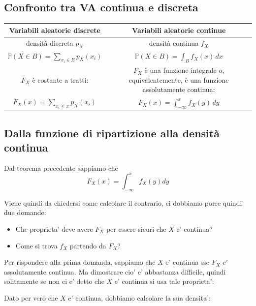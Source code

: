 \subsection{Confronto tra VA continua e discreta}
\begin{tabular}{|c|c|}
  \hline
  \textbf{Variabili aleatorie discrete} & \textbf{Variabili aleatorie continue} \\
  \hline
  densità discreta $p_X$ & densità continua $f_X$ \\
  \hline
  $\mathbb{P}(X \in B) = \sum_{x_i \in B} p_X(x_i)$ & $\mathbb{P}(X \in B) = \int_B f_X(x) \, dx$ \\
  \hline
  $F_X$ è costante a tratti: & $F_X$ è una funzione integrale o, equivalentemente, è una funzione assolutamente continua: \\
  $F_X(x) = \sum_{x_i \leq x} p_X(x_i)$ & $F_X(x) = \int_{-\infty}^x f_X(y) \, dy$ \\
  \hline
\end{tabular}

\subsection{Dalla funzione di ripartizione alla densità continua}
Dal teorema precedente sappiamo che 
\[
  F_X(x) = \int_{-\infty}^{x} f_X(y) dy
\]

Viene quindi da chiedersi come calcolare il contrario, ci dobbiamo porre quindi due domande:
\begin{itemize}
\item Che proprieta' deve avere $ F_X $ per essere sicuri che $ X $ e' continua?
\item Come si trova $ f_X $ partendo da $ F_X $?
\end{itemize}

Per rispondere alla prima domanda, sappiamo che $ X $ e' continua sse $ F_X $ e' assolutamente continua. Ma dimostrare cio' e' abbastanza difficile, quindi solitamente se non ci e' detto che $ X $ e' continua si usa tale proprieta':


Dato per vero che $ X $ e' continua, dobbiamo calcolare la sua densita':


